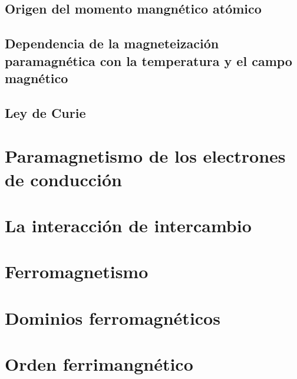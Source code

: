 \subsection{Origen del momento mangnético atómico}

\subsection[Dependencia de la magnetización respecto $\vec{\Bn}$ y $T$]{Dependencia de la magneteización paramagnética con la temperatura y el campo magnético}

\subsection{Ley de Curie}

\section{Paramagnetismo de los electrones de conducción}

\section{La interacción de intercambio}

\section{Ferromagnetismo}

\section{Dominios ferromagnéticos}

\section{Orden ferrimangnético}

